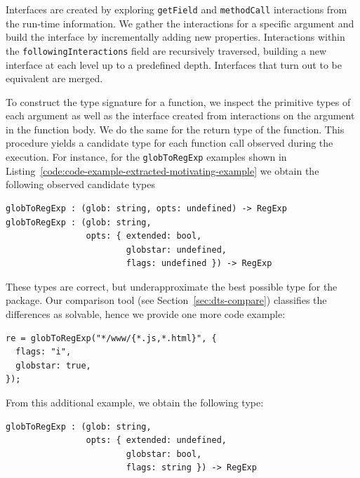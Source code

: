 \documentclass[sigconf]{acmart}
\begin{document}
Interfaces are created by exploring \texttt{getField} and \texttt{methodCall} interactions from the run-time information. We
gather the interactions for a specific argument and build the
interface by incrementally adding new properties. Interactions within
the \texttt{followingInteractions} field are recursively traversed,
building a new interface at each level up to a predefined depth. Interfaces that turn out
to be equivalent are merged.

To construct the type signature for a function, we inspect the
primitive types of each argument as well as the interface created from
interactions on the argument in the function body. We do the same for
the return type of the function. This procedure yields a candidate
type for each function call observed during the execution.
For instance, for the \lstinline{globToRegExp} examples shown in
Listing~\ref{code:code-example-extracted-motivating-example} we obtain
the following observed candidate types
\begin{verbatim}
globToRegExp : (glob: string, opts: undefined) -> RegExp
globToRegExp : (glob: string, 
                opts: { extended: bool,
                        globstar: undefined,
                        flags: undefined }) -> RegExp
\end{verbatim}
These types are correct, but underapproximate the best possible type
for the package. Our comparison tool (see Section~\ref{sec:dts-compare}) classifies the differences as
solvable, hence we provide one more code example:
\begin{verbatim}
re = globToRegExp("*/www/{*.js,*.html}", {
  flags: "i",
  globstar: true,
});
\end{verbatim}
From this additional example, we obtain the following type:
\begin{verbatim}
globToRegExp : (glob: string, 
                opts: { extended: undefined,
                        globstar: bool,
                        flags: string }) -> RegExp
\end{verbatim}
\end{document}
